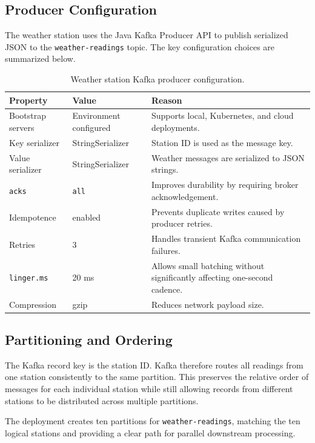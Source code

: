 \documentclass[12pt,a4paper]{article}
\begin{document}
\subsection{Producer Configuration}
The weather station uses the Java Kafka Producer API to publish serialized JSON to the \texttt{weather-readings} topic. The key configuration choices are summarized below.

\begin{table}[H]
\centering
\caption{Weather station Kafka producer configuration.}
\begin{tabularx}{\textwidth}{l l X}
\toprule
\textbf{Property} & \textbf{Value} & \textbf{Reason} \\
\midrule
Bootstrap servers & Environment configured & Supports local, Kubernetes, and cloud deployments. \\
Key serializer & StringSerializer & Station ID is used as the message key. \\
Value serializer & StringSerializer & Weather messages are serialized to JSON strings. \\
\texttt{acks} & \texttt{all} & Improves durability by requiring broker acknowledgement. \\
Idempotence & enabled & Prevents duplicate writes caused by producer retries. \\
Retries & 3 & Handles transient Kafka communication failures. \\
\texttt{linger.ms} & 20 ms & Allows small batching without significantly affecting one-second cadence. \\
Compression & gzip & Reduces network payload size. \\
\bottomrule
\end{tabularx}
\end{table}

\subsection{Partitioning and Ordering}
The Kafka record key is the station ID. Kafka therefore routes all readings from one station consistently to the same partition. This preserves the relative order of messages for each individual station while still allowing records from different stations to be distributed across multiple partitions.

The deployment creates ten partitions for \texttt{weather-readings}, matching the ten logical stations and providing a clear path for parallel downstream processing.
\end{document}
